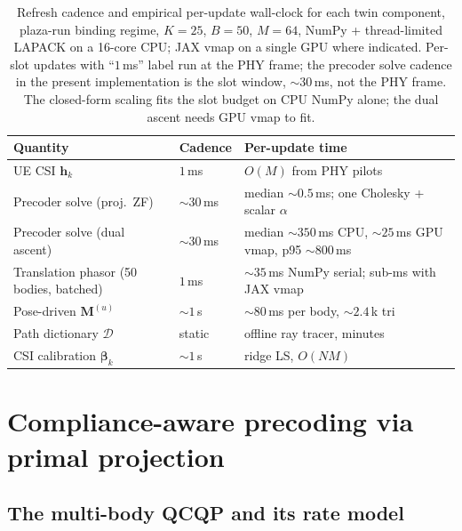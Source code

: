 \documentclass[journal,twocolumn,10pt]{IEEEtran}
\theoremstyle{plain}
\theoremstyle{remark}
\newcommand{\hh}{\mathbf{h}}
\newcommand{\Mmat}{\mathbf{M}}
\newcommand{\Dict}{\mathcal{D}}
\begin{document}
\begin{table}[!t]
\caption{Refresh cadence and empirical per-update wall-clock for
each twin component, plaza-run binding regime, $K = 25$, $B = 50$,
$M = 64$, NumPy + thread-limited LAPACK on a 16-core CPU; JAX vmap
on a single GPU where indicated. Per-slot updates with ``$1\,$ms''
label run at the PHY frame; the precoder solve cadence in the
present implementation is the slot window, $\sim 30\,$ms, not the
PHY frame. The closed-form scaling fits the slot budget on CPU
NumPy alone; the dual ascent needs GPU vmap to fit.}
\label{tab:cadence}
\centering
\small
\begin{tabular}{@{}p{}p{}p{}@{}}
\toprule
Quantity & Cadence & Per-update time \\
\midrule
UE CSI $\hh_k$ & $1\,$ms & $O(M)$ from PHY pilots \\
Precoder solve (proj.\ ZF) & $\sim 30\,$ms & median $\sim 0.5\,$ms; one Cholesky + scalar $\alpha$ \\
Precoder solve (dual ascent) & $\sim 30\,$ms & median $\sim 350\,$ms CPU, $\sim 25\,$ms GPU vmap, p95 $\sim 800\,$ms \\
Translation phasor (50 bodies, batched) & $1\,$ms & $\sim 35\,$ms NumPy serial; sub-ms with JAX vmap \\
Pose-driven $\Mmat^{(u)}$ & $\sim 1\,$s & $\sim 80\,$ms per body, $\sim 2.4$\,k tri \\
Path dictionary $\Dict$ & static & offline ray tracer, minutes \\
CSI calibration $\bm\beta_k$ & $\sim 1\,$s & ridge LS, $O(N M)$ \\
\bottomrule
\end{tabular}
\end{table}


\section{Compliance-aware precoding via primal projection}\label{sec:precoder}

\subsection{The multi-body QCQP and its rate model}\label{sec:qcqp}
\end{document}
